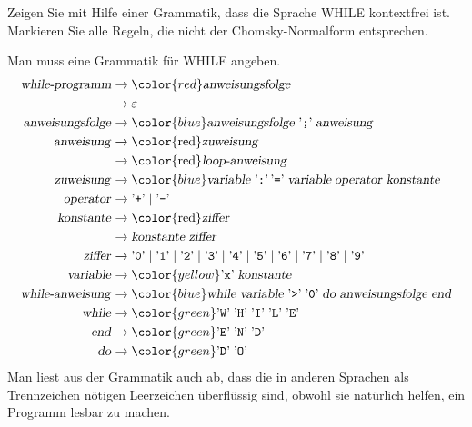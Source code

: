 Zeigen Sie mit Hilfe einer Grammatik, dass die Sprache WHILE kontextfrei ist.
Markieren Sie alle Regeln, die nicht der Chomsky-Normalform entsprechen.


\begin{loesung}
Man muss eine Grammatik für WHILE angeben.
\begin{align*}
\text{\textsl{while-programm}}&\to{\color{red}\text{\textsl{anweisungsfolge}}}\\
&\to\varepsilon\\
\text{\textsl{anweisungsfolge}}
&\to{\color{blue}\text{\textsl{anweisungsfolge}}\;\text{'{\tt ;}'}\;
\text{\textsl{anweisung}}}
\\
\text{\textsl{anweisung}}
&\to\text{\color{red}\textsl{zuweisung}}
\\
&\to\text{\color{red}\textsl{loop-anweisung}}
\\
\text{\textsl{zuweisung}}
&\to
{\color{blue}
\text{\textsl{variable}}\; \text{'{\tt :}'}\, \text{'{\tt =}'}\;
\textsl{variable}\;\text{\textsl{operator}}\;\text{\textsl{konstante}}}
\\
\text{\textsl{operator}}
&\to\text{'{\tt +}'}\mid \text{'{\tt -}'}
\\
\text{\textsl{konstante}}&\to\text{\color{red}\textsl{ziffer}}\\
&\to\text{\textsl{konstante}}\;\text{\textsl{ziffer}}
\\
\text{\textsl{ziffer}}&\to 
\text{'{\tt 0}'}\mid 
\text{'{\tt 1}'}\mid 
\text{'{\tt 2}'}\mid 
\text{'{\tt 3}'}\mid 
\text{'{\tt 4}'}\mid 
\text{'{\tt 5}'}\mid 
\text{'{\tt 6}'}\mid 
\text{'{\tt 7}'}\mid 
\text{'{\tt 8}'}\mid 
\text{'{\tt 9}'}\\
\text{\textsl{variable}}&\to{\color{yellow} \text{'{\tt x}'}\;\text{\textsl{konstante}}}\\
\text{\textsl{while-anweisung}}&\to{\color{blue}
\text{\textsl{while}}\;
\text{\textsl{variable}}\;
\text{'{\tt >}'}\;
\text{'{\tt 0}'}\;
\text{\textsl{do}}\;
\text{\textsl{anweisungsfolge}}\;
\text{\textsl{end}}}\\
\text{\textsl{while}}&\to
{\color{green}\text{'{\tt W}'}\; \text{'{\tt H}'}\; \text{'{\tt I}'}\; \text{'{\tt L}'}\; \text{'{\tt E}'}}\\
\text{\textsl{end}}&\to{\color{green} \text{'{\tt E}'}\; \text{'{\tt N}'}\; \text{'{\tt D}'}}\\
\text{\textsl{do}}&\to{\color{green} \text{'{\tt D}'}\; \text{'{\tt O}'}} \\
\end{align*}
Man liest aus der Grammatik auch ab, dass die in anderen Sprachen als
Trennzeichen nötigen Leerzeichen überflüssig sind, obwohl sie natürlich
helfen, ein Programm lesbar zu machen.


\end{loesung}

